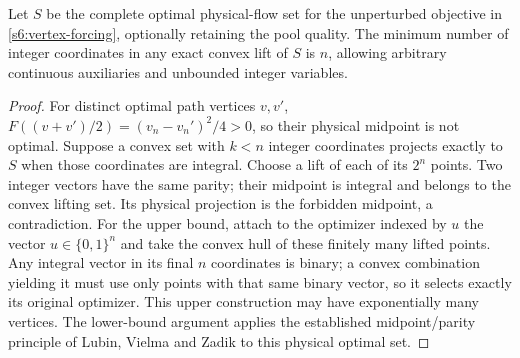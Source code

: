 \begin{corollary}\label{s6:integer-lift}
Let $S$ be the complete optimal physical-flow set for the unperturbed
objective in \cref{s6:vertex-forcing}, optionally retaining the pool quality.
The minimum number of integer coordinates in any exact convex lift of
$S$ is $n$, allowing arbitrary continuous auxiliaries and unbounded
integer variables.
\end{corollary}
\begin{proof}
For distinct optimal path vertices $v,v'$,
$F((v+v')/2)=(v_n-v_n')^2/4>0$, so their physical midpoint is not
optimal. Suppose a convex set with $k<n$ integer coordinates projects
exactly to $S$ when those coordinates are integral. Choose a lift of
each of its $2^n$ points. Two integer vectors have the same parity;
their midpoint is integral and belongs to the convex lifting set.
Its physical projection is the forbidden midpoint, a contradiction.
For the upper bound, attach to the optimizer indexed by $u$ the vector
$u\in\{0,1\}^n$ and take the convex hull of these finitely many lifted
points. Any integral vector in its final $n$ coordinates is binary;
a convex combination yielding it must use only points with that same
binary vector, so it selects exactly its original optimizer.
This upper construction may have exponentially many vertices.
The lower-bound argument applies the established midpoint/parity principle
of Lubin, Vielma and Zadik \cite[Section~4.2]{s6:lubin2022} to
this physical optimal set.
\end{proof}

